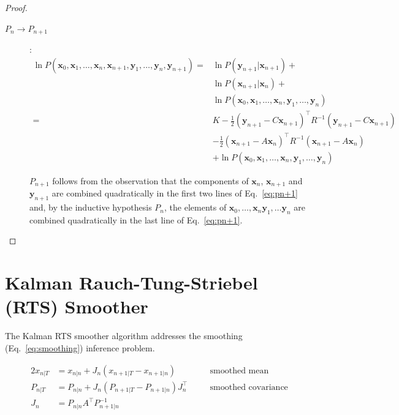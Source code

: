 \documentclass[12pt]{article}
\begin{document}
\begin{proof}
\begin{description}
        \item[$P_n\rightarrow P_{n+1}$]:
            \begin{align}
                \ln P(\mathbf{x}_0, \mathbf{x}_1, \ldots, \mathbf{x}_n, \mathbf{x}_{n+1},\mathbf{y}_1, \ldots, \mathbf{y}_{n}, \mathbf{y}_{n+1})=&\ln P(\mathbf{y}_{n+1}|\mathbf{x}_{n+1})+\nonumber\\
                &\ln P(\mathbf{x}_{n+1}|\mathbf{x}_n)+\nonumber\\
                &\ln P(\mathbf{x}_0,\mathbf{x}_1,\ldots,\mathbf{x}_n,\mathbf{y}_1, \ldots, \mathbf{y}_{n})\nonumber\\
                =&K-\frac{1}{2}(\mathbf{y}_{n+1}-C\mathbf{x}_{n+1})^\intercal R^{-1}(\mathbf{y}_{n+1}-C\mathbf{x}_{n+1})\nonumber\\
                 &-\frac{1}{2}(\mathbf{x}_{n+1}-A\mathbf{x}_{n})^\intercal R^{-1}(\mathbf{x}_{n+1}-A\mathbf{x}_{n})\nonumber\\
                 &+\ln P(\mathbf{x}_0,\mathbf{x}_1,\ldots,\mathbf{x}_n,\mathbf{y}_1, \ldots, \mathbf{y}_{n})\label{eq:pn+1}
            \end{align}

            $P_{n+1}$ follows from the observation that the components of
            $\mathbf{x}_n$, $\mathbf{x}_{n+1}$ and $\mathbf{y}_{n+1}$ are combined
            quadratically in the first two lines of Eq.~\ref{eq:pn+1} and, by
            the inductive hypothesis $P_n$, the elements of
            $\mathbf{x}_0,\ldots,\mathbf{x}_n\mathbf{y}_1,\ldots\mathbf{y}_n$
            are combined quadratically in the last line of Eq.~\ref{eq:pn+1}.

    \end{description}

\end{proof}

\section{Kalman Rauch-Tung-Striebel (RTS) Smoother}

The Kalman RTS smoother algorithm addresses the smoothing (Eq.~\ref{eq:smoothing})
inference problem.

\begin{alignat*}{2}
    x_{n|T}&=x_{n|n}+J_n(x_{n+1|T}-x_{n+1|n})\quad&&\text{smoothed mean}\\
    P_{n|T}&=P_{n|n}+J_n(P_{n+1|T}-P_{n+1|n})J_n^\intercal\quad&&\text{smoothed covariance}\\
    J_n&=P_{n|n}A^\intercal P_{n+1|n}^{-1}&&
\end{alignat*}
\end{document}
